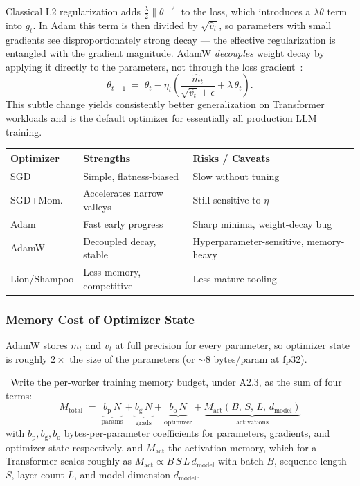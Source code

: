 Classical L2 regularization adds $\tfrac{\lambda}{2}\|\theta\|^2$ to the
loss, which introduces a $\lambda \theta$ term into $g_t$. In Adam this
term is then divided by $\sqrt{\hat v_t}$, so parameters with small
gradients see disproportionately strong decay — the effective
regularization is entangled with the gradient magnitude. AdamW
\emph{decouples} weight decay by applying it directly to the parameters,
not through the loss gradient~\citep{loshchilov2019decoupled}:
\begin{equation}
\label{eq:week2-adamw-update}
\theta_{t+1} \;=\; \theta_t
  - \eta_t\!\left(\frac{\hat m_t}{\sqrt{\hat v_t} + \epsilon} + \lambda\,\theta_t\right).
\end{equation}
This subtle change yields consistently better generalization on
Transformer workloads and is the default optimizer for essentially all
production LLM training.

\begin{center}
\begin{tabular}{|l|l|l|}
\hline
Optimizer & Strengths & Risks / Caveats \\
\hline
SGD        & Simple, flatness-biased & Slow without tuning \\
SGD+Mom.   & Accelerates narrow valleys & Still sensitive to $\eta$ \\
Adam       & Fast early progress & Sharp minima, weight-decay bug \\
AdamW      & Decoupled decay, stable & Hyperparameter-sensitive, memory-heavy \\
Lion/Shampoo & Less memory, competitive & Less mature tooling \\
\hline
\end{tabular}
\end{center}

\subsubsection{Memory Cost of Optimizer State}

AdamW stores $m_t$ and $v_t$ at full precision for every parameter, so
optimizer state is roughly $2\times$ the size of the parameters (or
$\sim 8$ bytes/param at fp32).

\Ident\ Write the per-worker training memory budget, under A2.3, as
the sum of four terms:
\begin{equation}
\label{eq:week2-mem-budget}
\boxed{\;M_{\mathrm{total}}
  \;=\; \underbrace{b_{\mathrm p}\, N}_{\text{params}}
     + \underbrace{b_{\mathrm g}\, N}_{\text{grads}}
     + \underbrace{b_{\mathrm o}\, N}_{\text{optimizer}}
     + \underbrace{M_{\mathrm{act}}(B,\,S,\,L,\,d_{\mathrm{model}})}_{\text{activations}}\;}
\end{equation}
with $b_{\mathrm p}, b_{\mathrm g}, b_{\mathrm o}$ bytes-per-parameter
coefficients for parameters, gradients, and optimizer state
respectively, and $M_{\mathrm{act}}$ the activation memory, which for
a Transformer scales roughly as $M_{\mathrm{act}} \propto
B\,S\,L\,d_{\mathrm{model}}$ with batch $B$, sequence length $S$,
layer count $L$, and model dimension $d_{\mathrm{model}}$.

